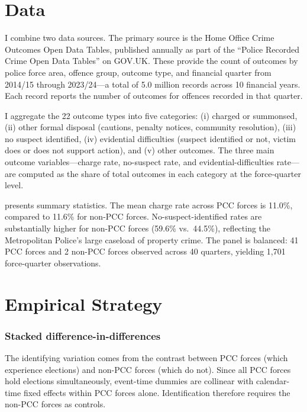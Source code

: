 \documentclass[12pt]{article}
\begin{document}
\section{Data}

I combine two data sources. The primary source is the Home Office Crime Outcomes Open Data Tables, published annually as part of the ``Police Recorded Crime Open Data Tables'' on GOV.UK. These provide the count of outcomes by police force area, offence group, outcome type, and financial quarter from 2014/15 through 2023/24---a total of 5.0 million records across 10 financial years. Each record reports the number of outcomes for offences recorded in that quarter.

I aggregate the 22 outcome types into five categories: (i) charged or summonsed, (ii) other formal disposal (cautions, penalty notices, community resolution), (iii) no suspect identified, (iv) evidential difficulties (suspect identified or not, victim does or does not support action), and (v) other outcomes. The three main outcome variables---charge rate, no-suspect rate, and evidential-difficulties rate---are computed as the share of total outcomes in each category at the force-quarter level.

 presents summary statistics. The mean charge rate across PCC forces is 11.0\%, compared to 11.6\% for non-PCC forces. No-suspect-identified rates are substantially higher for non-PCC forces (59.6\% vs.\ 44.5\%), reflecting the Metropolitan Police's large caseload of property crime. The panel is balanced: 41 PCC forces and 2 non-PCC forces observed across 40 quarters, yielding 1,701 force-quarter observations.




\section{Empirical Strategy}

\subsubsection*{Stacked difference-in-differences} The identifying variation comes from the contrast between PCC forces (which experience elections) and non-PCC forces (which do not). Since all PCC forces hold elections simultaneously, event-time dummies are collinear with calendar-time fixed effects within PCC forces alone. Identification therefore requires the non-PCC forces as controls.
\end{document}
